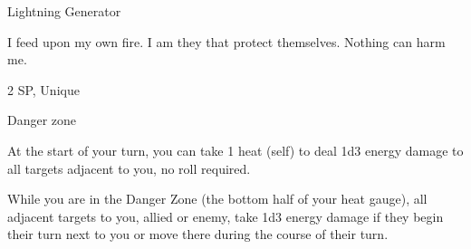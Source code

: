 Lightning Generator
 

I feed upon my own fire. I am they that protect themselves. Nothing can harm me.  

2 SP, Unique
 

Danger zone
 
At the start of your turn, you can take 1 heat (self) to deal 1d3 energy damage to all targets  
adjacent to you, no roll required.
 

While you are in the Danger Zone (the bottom half of your heat gauge), all adjacent targets to  
you, allied or enemy, take 1d3 energy damage if they begin their turn next to you or move there  
during the course of their turn.
 
